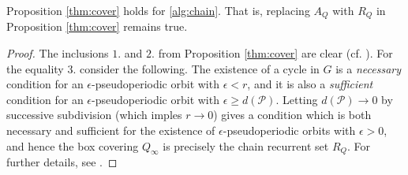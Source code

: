 %
%
%

\begin{corollary}
    Proposition \ref{thm:cover} holds for \autoref{alg:chain}. That is, replacing $A_Q$ 
    with $R_Q$ in Proposition \ref{thm:cover} remains true. 
\end{corollary}

\begin{proof}
    The inclusions $1.$ and $2.$ from Proposition \ref{thm:cover} are clear (cf. 
    \cite*{dynbook}). For the equality $3.$ consider the following. 
    The existence of a cycle in $G$ is a \emph{necessary} condition for an
    $\epsilon$-pseudoperiodic orbit with $\epsilon < r$, and it is also a 
    \emph{sufficient} condition for an $\epsilon$-pseudoperiodic orbit with 
    $\epsilon \geq d(\mathcal{P})$. Letting $d(\mathcal{P}) \to 0$ by successive subdivision 
    (which imples $r \to 0$) gives a condition which 
    is both necessary and sufficient for the existence of $\epsilon$-pseudoperiodic orbits 
    with $\epsilon > 0$, and hence the box covering $Q_\infty$ is precisely the chain 
    recurrent set $R_Q$. For further details, see \cite*{chain,dynbook}. 
\end{proof}


